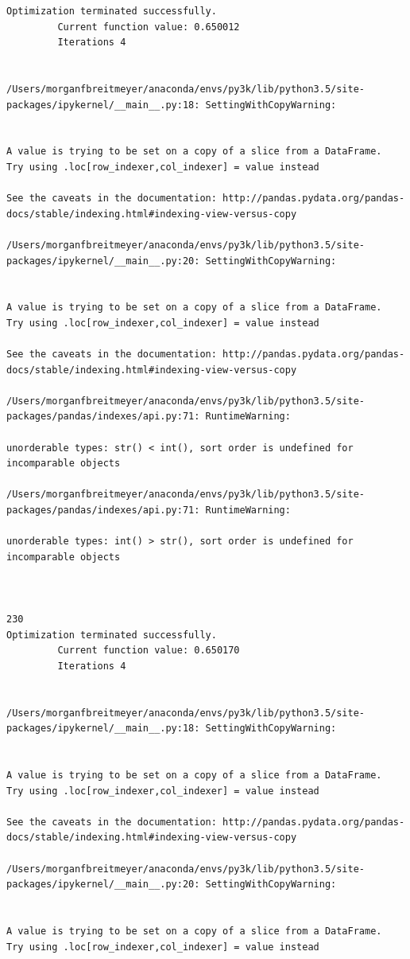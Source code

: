 \begin{lstlisting}
Optimization terminated successfully.
         Current function value: 0.650012
         Iterations 4


/Users/morganfbreitmeyer/anaconda/envs/py3k/lib/python3.5/site-packages/ipykernel/__main__.py:18: SettingWithCopyWarning:


A value is trying to be set on a copy of a slice from a DataFrame.
Try using .loc[row_indexer,col_indexer] = value instead

See the caveats in the documentation: http://pandas.pydata.org/pandas-docs/stable/indexing.html#indexing-view-versus-copy

/Users/morganfbreitmeyer/anaconda/envs/py3k/lib/python3.5/site-packages/ipykernel/__main__.py:20: SettingWithCopyWarning:


A value is trying to be set on a copy of a slice from a DataFrame.
Try using .loc[row_indexer,col_indexer] = value instead

See the caveats in the documentation: http://pandas.pydata.org/pandas-docs/stable/indexing.html#indexing-view-versus-copy

/Users/morganfbreitmeyer/anaconda/envs/py3k/lib/python3.5/site-packages/pandas/indexes/api.py:71: RuntimeWarning:

unorderable types: str() < int(), sort order is undefined for incomparable objects

/Users/morganfbreitmeyer/anaconda/envs/py3k/lib/python3.5/site-packages/pandas/indexes/api.py:71: RuntimeWarning:

unorderable types: int() > str(), sort order is undefined for incomparable objects



230
Optimization terminated successfully.
         Current function value: 0.650170
         Iterations 4


/Users/morganfbreitmeyer/anaconda/envs/py3k/lib/python3.5/site-packages/ipykernel/__main__.py:18: SettingWithCopyWarning:


A value is trying to be set on a copy of a slice from a DataFrame.
Try using .loc[row_indexer,col_indexer] = value instead

See the caveats in the documentation: http://pandas.pydata.org/pandas-docs/stable/indexing.html#indexing-view-versus-copy

/Users/morganfbreitmeyer/anaconda/envs/py3k/lib/python3.5/site-packages/ipykernel/__main__.py:20: SettingWithCopyWarning:


A value is trying to be set on a copy of a slice from a DataFrame.
Try using .loc[row_indexer,col_indexer] = value instead


\end{lstlisting}
